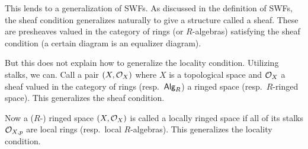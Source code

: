     This lends to a generalization of SWFs.
    As discussed in the definition of SWFs, the sheaf condition generalizes naturally to give a structure called a sheaf.
    These are presheaves valued in the category of rings (or $R$-algebras) satisfying the sheaf condition (a certain diagram is an equalizer diagram).

    But this does not explain how to generalize the locality condition.
    Utilizing stalks, we can.
    Call a pair $(X,{{\cal O}}_X)$ where $X$ is a topological space and ${{\cal O}}_X$ a sheaf valued in the category of rings (resp.\ ${\sf Alg}_R$) a {\emphcolor ringed space} (resp.\ {\emphcolor $R$-ringed space}).
    This generalizes the sheaf condition.

    Now a ($R$-) ringed space $(X,{{\cal O}}_X)$ is called a {\emphcolor locally ringed space} if all of its stalks ${{\cal O}}_{X,p}$ are local rings (resp.\ local $R$-algebras).
    This generalizes the locality condition.

\enote


